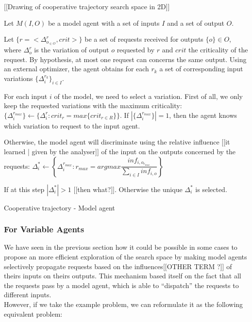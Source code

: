 [[Drawing of cooperative trajectory search space in 2D]]

Let $M(I,O)$ be a model agent with a set of inputs $I$ and a set of output $O$.

Let $\{r = <\Delta_{o_{\in O}}^{r}, crit>\}$ be a set of  requests received for outputs $\{o\} \in O$, where $\Delta_{o}^{r}$ is the variation of output $o$ requested by $r$ and $crit$ the criticality of the request. By hypothesis, at most one request can concerns the same output.
Using an external optimizer, the agent obtains for each $r_k$ a set of corresponding input variations $\{\Delta_i^{r_k}\}_{i \in I}$.

For each input $i$ of the model, we need to select a variation.
First of all, we only keep the requested variations with the maximum criticality:  $\{\Delta_i^{r_{max}}\} \leftarrow \{\Delta_i^r : crit_r = max \{crit_{r \in R}\}\}$.
If $|\{\Delta_i^{r_{max}}\}| =  1$, then the agent knows which variation to request to the input agent.

Otherwise, the model agent will discriminate using the relative influence [[it learned | given by the analyser]] of the input on the outputs concerned by the requests: 
$\Delta_i^* \leftarrow \left\{ \Delta_i^{r_{max}} : r_{max} = argmax \dfrac{inf_{i,o_{r_{max}}}}{\sum \limits_{i \in I} inf_{i,o}} \right\}$

If at this step $|\Delta_i^*| >1$ [[then what?]]. Otherwise the unique $\Delta_i^*$ is selected.

\begin{algorithm}
\caption{Cooperative trajectory - Model agent}
\label{algo_cooperative_trajectory_model}


\end{algorithm}

\subsubsection{For Variable Agents}

We have seen in the previous section how it could be possible in some cases to propose an more efficient exploration of the search space by making model agents selectively propagate requests based on the influences[[OTHER TERM ?]] of theirs inputs on theirs outputs. This mechanism based itself on the fact that all the requests pass by a model agent, which is able to \enquote{dispatch} the requests to different inputs.\\
However, if we take the example problem, we can reformulate it as the following equivalent problem:

